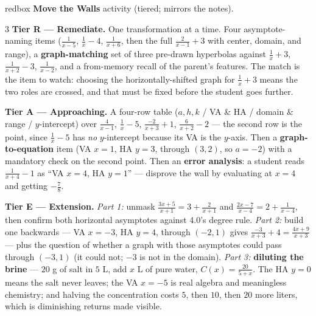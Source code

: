 \documentclass[10pt]{article}
\begin{document}
\begin{skillbox}{redbox}
\textbf{Move the Walls} activity (tiered; mirrors the notes).
\begin{multicols}{3}
\textbf{Tier R --- Remediate.} One transformation at a time. Four asymptote-naming items
($\frac{1}{x-5}$, $\frac1x-4$, $\frac{1}{x+6}$, then the full $\frac{2}{x-1}+3$ with center, domain,
and range), a \textbf{graph-matching} set of three pre-drawn hyperbolas against
$\frac1x+3$, $\frac{1}{x+2}-3$, $\frac{1}{x-2}$, and a from-memory recall of the parent's features. The
match is the item to watch: choosing the horizontally-shifted graph for $\frac1x+3$ means the two roles
are crossed, and that must be fixed before the student goes further.

\columnbreak
\textbf{Tier A --- Approaching.} A four-row table ($a,h,k$ / VA \& HA / domain \& range / $y$-intercept)
over $\frac{4}{x-1}$, $\frac1x-5$, $\frac{-2}{x+3}+1$, $\frac{6}{x+2}-2$ --- the second row is the
point, since $\frac1x-5$ has \emph{no} $y$-intercept because its VA is the $y$-axis. Then a
\textbf{graph-to-equation} item (VA $x=1$, HA $y=3$, through $(3,2)$, so $a=-2$) with a mandatory check
on the second point. Then an \textbf{error analysis}: a student reads $\frac{1}{x+4}-1$ as ``VA $x=4$,
HA $y=1$'' --- disprove the wall by evaluating at $x=4$ and getting $-\frac78$.

\columnbreak
\textbf{Tier E --- Extension.} \emph{Part 1:} unmask $\frac{3x+5}{x+1}=3+\frac{2}{x+1}$ and
$\frac{2x-7}{x-4}=2+\frac{1}{x-4}$, then confirm both horizontal asymptotes against 4.0's degree rule.
\emph{Part 2:} build one backwards --- VA $x=-3$, HA $y=4$, through $(-2,1)$ gives
$\frac{-3}{x+3}+4=\frac{4x+9}{x+3}$ --- plus the question of whether a graph with those asymptotes could
pass through $(-3,1)$ (it could not; $-3$ is not in the domain). \emph{Part 3:} \textbf{diluting the
brine} --- $20$ g of salt in $5$ L, add $x$ L of pure water, $C(x)=\frac{20}{5+x}$. The HA $y=0$ means
the salt never leaves; the VA $x=-5$ is real algebra and meaningless chemistry; and halving the
concentration costs $5$, then $10$, then $20$ more liters, which is diminishing returns made visible.
\end{multicols}
\end{skillbox}
\end{document}
